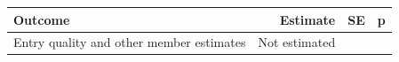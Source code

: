 \begin{tabular}{l
rrr
}
\toprule
Outcome & Estimate & SE & p
\\
\midrule
Entry quality and other member estimates & Not estimated &  & 
\\
\bottomrule
\end{tabular}
